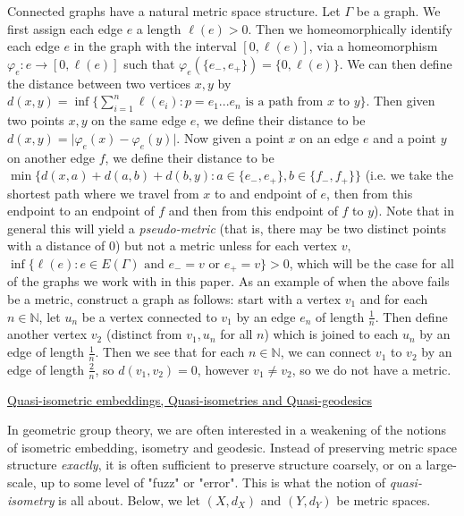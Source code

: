 \documentclass[12pt]{article}
\newcommand{\vs}{\vskip10pt}
\begin{document}
	Connected graphs have a natural metric space structure. Let $\Gamma$ be a graph. We first assign each edge $e$ a length $\ell(e) > 0$. Then we homeomorphically identify each edge $e$ in the graph with the interval $[0,\ell(e)]$, via a homeomorphism $\varphi_e: e \rightarrow [0,\ell(e)]$ such that $\varphi_e (\{e_{-}, e_{+}\}) = \{0,\ell(e)\}$. We can then define the distance between two vertices $x,y$ by $d(x,y) = \inf \{\sum_{i=1}^n \ell(e_i): p = e_1...e_n \text{ is a path from } x \text{ to } y\}$. Then given two points $x,y$ on the same edge $e$, we define their distance to be $d(x,y) = \vert \varphi_e(x) - \varphi_e(y) \vert$. Now given a point $x$ on an edge $e$ and a point $y$ on another edge $f$, we define their distance to be $\min \{d(x, a) + d(a, b) + d(b, y): a \in \{e_{-}, e_{+}\}, b \in \{f_{-}, f_{+}\}\}$ (i.e. we take the shortest path where we travel from $x$ to and endpoint of $e$, then from this endpoint to an endpoint of $f$ and then from this endpoint of $f$ to $y$). Note that in general this will yield a \textit{pseudo-metric} (that is, there may be two distinct points with a distance of 0) but not a metric unless for each vertex $v,$ $\inf \{\ell(e) : e \in E(\Gamma) \text{ and } e_- = v \text{ or } e_+ = v\}> 0$, which will be the case for all of the graphs we work with in this paper. As an example of when the above fails be a metric, construct a graph as follows: start with a vertex $v_1$ and for each $n \in \mathbb{N}$, let $u_n$ be a vertex connected to $v_1$ by an edge $e_n$ of length $\frac{1}{n}$. Then define another vertex $v_2$ (distinct from $v_1, u_n$ for all $n$) which is joined to each $u_n$ by an edge of length $\frac{1}{n}$. Then we see that for each $n \in \mathbb{N}$, we can connect $v_1$ to $v_2$ by an edge of length $\frac{2}{n}$, so $d(v_1, v_2) = 0$, however $v_1 \neq v_2$, so we do not have a metric. 
	
	
	\vs 
	
	\underline{Quasi-isometric embeddings, Quasi-isometries and Quasi-geodesics}
	
	\vs 
	
	In geometric group theory, we are often interested in a weakening of the notions of isometric embedding, isometry and geodesic. Instead of preserving metric space structure \textit{exactly}, it is often sufficient to preserve structure coarsely, or on a large-scale, up to some level of "fuzz" or "error". This is what the notion of \textit{quasi-isometry} is all about. Below, we let $(X,d_X)$ and $(Y, d_Y)$ be metric spaces.
	
\end{document}
